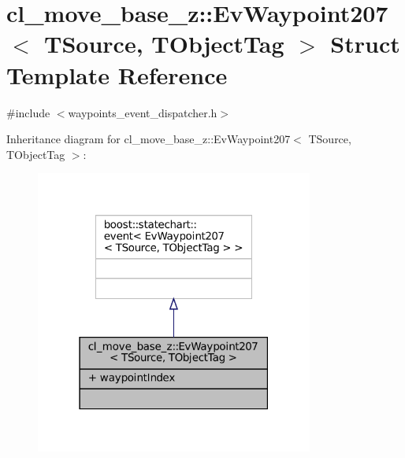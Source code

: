 \hypertarget{structcl__move__base__z_1_1EvWaypoint207}{}\section{cl\+\_\+move\+\_\+base\+\_\+z\+:\+:Ev\+Waypoint207$<$ T\+Source, T\+Object\+Tag $>$ Struct Template Reference}
\label{structcl__move__base__z_1_1EvWaypoint207}


{\ttfamily \#include $<$waypoints\+\_\+event\+\_\+dispatcher.\+h$>$}



Inheritance diagram for cl\+\_\+move\+\_\+base\+\_\+z\+:\+:Ev\+Waypoint207$<$ T\+Source, T\+Object\+Tag $>$\+:
\nopagebreak
\begin{figure}[H]
\begin{center}
\leavevmode
\includegraphics[width=259pt]{structcl__move__base__z_1_1EvWaypoint207__inherit__graph}
\end{center}
\end{figure}


